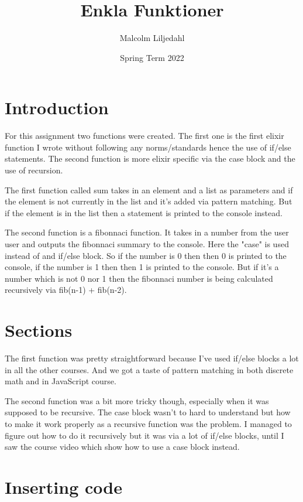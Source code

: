 \documentclass[a4paper,11pt]{article}
\begin{document}
\title{
    \textbf{Enkla Funktioner}
}
\author{Malcolm Liljedahl}
\date{Spring Term 2022}

\maketitle

\section*{Introduction}

For this assignment two functions were created. The first one is the first elixir function I wrote without following any norms/standards hence the use of if/else statements. The second function is more elixir specific via the case block and the use of recursion.

The first function called sum takes in an element and a list as parameters and if the element is not currently in the list and it's added via pattern matching. But if the element is in the list then a statement is printed to the console instead.

The second function is a fibonnaci function. It takes in a number from the user user and outputs the fibonnaci summary to the console. Here the "case" is used instead of and if/else block. So if the number is 0 then then 0 is printed to the console, if the number is 1 then then 1 is printed to the console. But if it's a number which is not 0 nor 1 then the fibonnaci number is being calculated recursively via fib(n-1) + fib(n-2).

\section*{Sections}

The first function was pretty straightforward because I've used if/else blocks a lot in all the other courses. And we got a taste of pattern matching in both discrete math and in JavaScript course.

The second function was a bit more tricky though, especially when it was supposed to be recursive. The case block wasn't to hard to understand but how to make it work properly as a recursive function was the problem. I managed to figure out how to do it recursively but it was via a lot of if/else blocks, until I saw the course video which show how to use a case block instead.


\section*{Inserting code}
\end{document}
